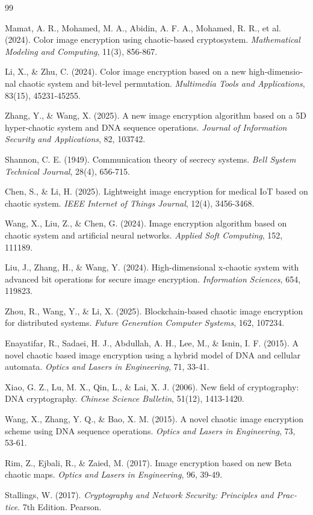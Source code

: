 \begin{thebibliography}{99}
\begin{LTRbibitems}
\begin{latin}
 Mamat, A. R., Mohamed, M. A., Abidin, A. F. A., Mohamed, R. R., et al. (2024). Color image encryption using chaotic-based cryptosystem. \textit{Mathematical Modeling and Computing}, 11(3), 856-867.

 Li, X., \& Zhu, C. (2024). Color image encryption based on a new high-dimensional chaotic system and bit-level permutation. \textit{Multimedia Tools and Applications}, 83(15), 45231-45255.

 Zhang, Y., \& Wang, X. (2025). A new image encryption algorithm based on a 5D hyper-chaotic system and DNA sequence operations. \textit{Journal of Information Security and Applications}, 82, 103742.

 Shannon, C. E. (1949). Communication theory of secrecy systems. \textit{Bell System Technical Journal}, 28(4), 656-715.

 Chen, S., \& Li, H. (2025). Lightweight image encryption for medical IoT based on chaotic system. \textit{IEEE Internet of Things Journal}, 12(4), 3456-3468.

 Wang, X., Liu, Z., \& Chen, G. (2024). Image encryption algorithm based on chaotic system and artificial neural networks. \textit{Applied Soft Computing}, 152, 111189.

 Liu, J., Zhang, H., \& Wang, Y. (2024). High-dimensional x-chaotic system with advanced bit operations for secure image encryption. \textit{Information Sciences}, 654, 119823.

 Zhou, R., Wang, Y., \& Li, X. (2025). Blockchain-based chaotic image encryption for distributed systems. \textit{Future Generation Computer Systems}, 162, 107234.

 Enayatifar, R., Sadaei, H. J., Abdullah, A. H., Lee, M., \& Isnin, I. F. (2015). A novel chaotic based image encryption using a hybrid model of DNA and cellular automata. \textit{Optics and Lasers in Engineering}, 71, 33-41.

 Xiao, G. Z., Lu, M. X., Qin, L., \& Lai, X. J. (2006). New field of cryptography: DNA cryptography. \textit{Chinese Science Bulletin}, 51(12), 1413-1420.

 Wang, X., Zhang, Y. Q., \& Bao, X. M. (2015). A novel chaotic image encryption scheme using DNA sequence operations. \textit{Optics and Lasers in Engineering}, 73, 53-61.

 Rim, Z., Ejbali, R., \& Zaied, M. (2017). Image encryption based on new Beta chaotic maps. \textit{Optics and Lasers in Engineering}, 96, 39-49.

 Stallings, W. (2017). \textit{Cryptography and Network Security: Principles and Practice}. 7th Edition. Pearson.
\end{latin}
\end{LTRbibitems}

\end{thebibliography}
